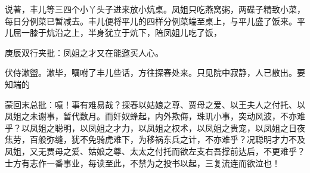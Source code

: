 \begin{parag}
    说著，丰儿等三四个小丫头子进来放小炕桌。凤姐只吃燕窝粥，两碟子精致小菜，每日分例菜已暂减去。丰儿便将平儿的四样分例菜端至桌上，与平儿盛了饭来。平儿屈一膝于炕沿之上，半身犹立于炕下，陪凤姐儿吃了饭，\begin{note}庚辰双行夹批：凤姐之才又在能邀买人心。\end{note}伏侍漱盥。漱毕，嘱咐了丰儿些话，方往探春处来。只见院中寂静，人已散出。要知端的
\end{parag}


\begin{parag}
    \begin{note}蒙回末总批：噫！事有难易哉？探春以姑娘之尊、贾母之爱、以王夫人之付托、以凤姐之未谢事，暂代数月。而奸奴蜂起，内外欺侮，珠玑小事，突动风波，不亦难乎？以凤姐之聪明，以凤姐之才力，以凤姐之权术，以凤姐之贵宠，以凤姐之日夜焦劳，百般弥缝，犹不免骑虎难下，为移祸东兵之计，不亦难乎？况聪明才力不及凤姐，又无贾母之爱、姑娘之尊、太太之付托而欲左支右吾撑前达后，不更难乎？士方有志作一番事业，每读至此，不禁为之投书以起，三复流连而欲泣也！\end{note}
\end{parag}
